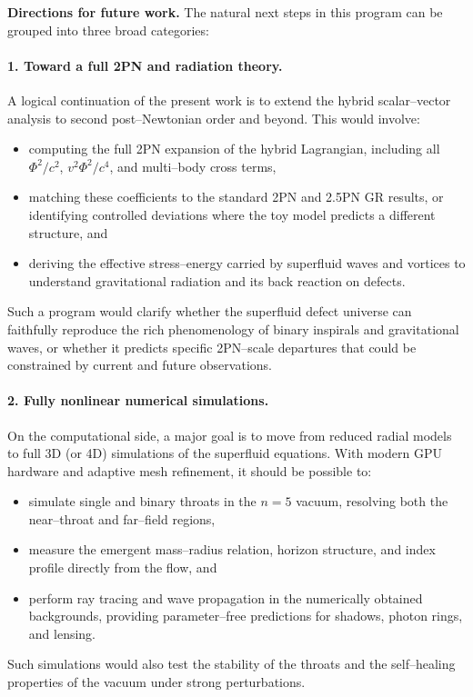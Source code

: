 \documentclass[11pt]{article}
\begin{document}
\vspace{0.5em}
\noindent\textbf{Directions for future work.}
The natural next steps in this program can be grouped into three broad
categories:

\paragraph{1. Toward a full 2PN and radiation theory.}
A logical continuation of the present work is to extend the hybrid
scalar--vector analysis to second post--Newtonian order and beyond.  This
would involve:
\begin{itemize}
  \item computing the full 2PN expansion of the hybrid Lagrangian,
        including all \(\Phi^2/c^2\), \(v^2 \Phi^2 / c^4\), and
        multi--body cross terms,
  \item matching these coefficients to the standard 2PN and 2.5PN GR
        results, or identifying controlled deviations where the toy
        model predicts a different structure, and
  \item deriving the effective stress--energy carried by superfluid waves
        and vortices to understand gravitational radiation and its back
        reaction on defects.
\end{itemize}
Such a program would clarify whether the superfluid defect universe can
faithfully reproduce the rich phenomenology of binary inspirals and
gravitational waves, or whether it predicts specific 2PN--scale departures
that could be constrained by current and future observations.

\paragraph{2. Fully nonlinear numerical simulations.}
On the computational side, a major goal is to move from reduced radial
models to full 3D (or 4D) simulations of the superfluid equations.  With
modern GPU hardware and adaptive mesh refinement, it should be possible to:
\begin{itemize}
  \item simulate single and binary throats in the \(n=5\) vacuum,
        resolving both the near--throat and far--field regions,
  \item measure the emergent mass--radius relation, horizon structure,
        and index profile directly from the flow, and
  \item perform ray tracing and wave propagation in the numerically
        obtained backgrounds, providing parameter--free predictions for
        shadows, photon rings, and lensing.
\end{itemize}
Such simulations would also test the stability of the throats and the
self--healing properties of the vacuum under strong perturbations.
\end{document}
